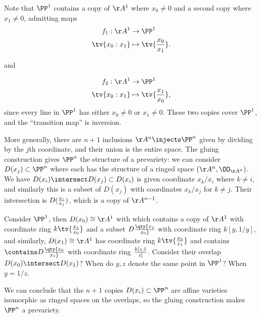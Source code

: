 \begin{example}[?]

Note that \(\PP^1\) contains a copy of \(\AA^1\) where \(x_0 \neq 0\)
and a second copy where \(x_1 \neq 0\), admitting maps
\begin{align*}  
f_1: \AA^1 &\to \PP^1 \\
\tv{x_0: x_1} &\mapsto \tv{{x_0 \over x_1}}
.\end{align*}

and

\begin{align*}  
f_2: \AA^1 &\to \PP^1 \\
\tv{x_0: x_1} &\mapsto \tv{{x_1 \over x_0}}
,\end{align*} since every line in \(\PP^1\) has either \(x_0\neq 0\) or
\(x_1 \neq 0\). These two copies cover \(\PP^1\), and the ``transition
map'' is inversion.

\end{example}

\begin{remark}

More generally, there are \(n+1\) inclusions \(\AA^n \injects \PP^n\)
given by dividing by the \(j\)th coordinate, and their union is the
entire space. The gluing construction gives \(\PP^n\) the structure of a
prevariety: we can consider \(D(x_j) \subset \PP^n\) where each has the
structure of a ringed space \((\AA^n, \OO_{\AA^n})\). We have
\(D(x_i) \intersect D(x_j) \subset D(x_i)\) is given coordinate
\(x_k/x_i\) where \(k\neq i\), and similarly this is a subset of
\(D(x_j)\) with coordinates \(x_k/x_j\) for \(k\neq j\). Their
intersection is \(D({x_i \over x_j})\), which is a copy of
\(\AA^{n-1}\).

\end{remark}

\begin{example}[?]

Consider \(\PP^1\), then \(D(x_0) \cong \AA^1\) with which contains a
copy of \(\AA^1\) with coordinate ring \(k\tv{{x_1\over x_0}}\) and a
subset \(D\qty{x_1\over x_0}\) with coordinate ring \(k[y, 1/y]\), and
similarly, \(D(x_1) \cong \AA^1\) has coordinate ring
\(k\tv{{x_0\over x_1}}\) and contains \(\contains D\qty{x_0\over x_1}\)
with coordinate ring \(k[z, 1\over z]\). Consider their overlap
\(D(x_0) \intersect D(x_1)\)? When do \(y, z\) denote the same point in
\(\PP^1\)? When \(y = 1/z\).

We can conclude that the \(n+1\) copies \(D(x_i) \subset \PP^n\) are
affine varieties isomorphic as ringed spaces on the overlaps, so the
gluing construction makes \(\PP^n\) a prevariety.

\end{example}

